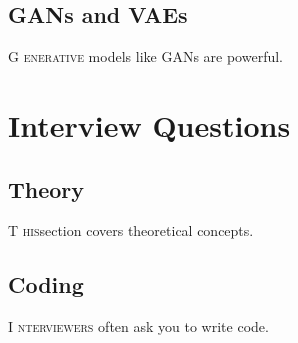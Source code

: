 \documentclass{book}
\begin{document}
\section{GANs and VAEs}
\lettrine{G}{ enerative} models like GANs are powerful. \lipsum[6]

\chapter{Interview Questions}

\section{Theory}
\lettrine{T}{ his}section covers theoretical concepts. \lipsum[7]

\section{Coding}
\lettrine{I}{  nterviewers} often ask you to write code. \lipsum[8]
\end{document}
